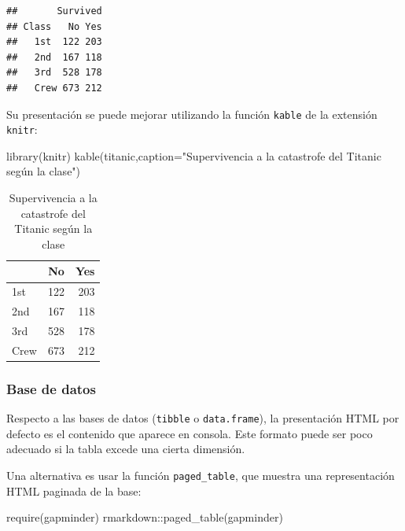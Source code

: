 \documentclass[
]{article}
\newenvironment{Shaded}{\begin{snugshade}}{\end{snugshade}}
\newcommand{\AttributeTok}[1]{\textcolor[rgb]{0.77,0.63,0.00}{#1}}
\newcommand{\FunctionTok}[1]{\textcolor[rgb]{0.00,0.00,0.00}{#1}}
\newcommand{\NormalTok}[1]{#1}
\newcommand{\SpecialCharTok}[1]{\textcolor[rgb]{0.00,0.00,0.00}{#1}}
\newcommand{\StringTok}[1]{\textcolor[rgb]{0.31,0.60,0.02}{#1}}
\numberwithin{ejcnt}{section}
\begin{document}
\begin{verbatim}
##       Survived
## Class   No Yes
##   1st  122 203
##   2nd  167 118
##   3rd  528 178
##   Crew 673 212
\end{verbatim}

Su presentación se puede mejorar utilizando la función \texttt{kable} de la extensión \texttt{knitr}:

\begin{Shaded}
\begin{Highlighting}[]
\FunctionTok{library}\NormalTok{(knitr)}
\FunctionTok{kable}\NormalTok{(titanic,}\AttributeTok{caption=}\StringTok{"Supervivencia a la catastrofe del Titanic según la clase"}\NormalTok{)}
\end{Highlighting}
\end{Shaded}

\begin{table}

\caption{\label{tab:unnamed-chunk-96}Supervivencia a la catastrofe del Titanic según la clase}
\centering
\begin{tabular}[t]{l|r|r}
\hline
  & No & Yes\\
\hline
1st & 122 & 203\\
\hline
2nd & 167 & 118\\
\hline
3rd & 528 & 178\\
\hline
Crew & 673 & 212\\
\hline
\end{tabular}
\end{table}

\hypertarget{base-de-datos}{%
\subsubsection{Base de datos}\label{base-de-datos}}

Respecto a las bases de datos (\texttt{tibble} o \texttt{data.frame}), la presentación HTML por defecto es el contenido que aparece en consola. Este formato puede ser poco adecuado si la tabla excede una cierta dimensión.

Una alternativa es usar la función \texttt{paged\_table}, que muestra una representación HTML paginada de la base:

\begin{Shaded}
\begin{Highlighting}[]
\FunctionTok{require}\NormalTok{(gapminder)}
\NormalTok{rmarkdown}\SpecialCharTok{::}\FunctionTok{paged\_table}\NormalTok{(gapminder)}
\end{Highlighting}
\end{Shaded}
\end{document}
